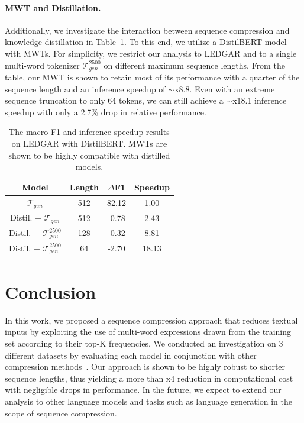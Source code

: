 \documentclass[11pt]{article}
\def\tokgen{\mathcal{T}_{gen}}
\begin{document}
\paragraph{MWT and Distillation.} 
Additionally, we investigate the interaction between sequence compression and knowledge distillation in Table~\ref{table:distillation}. To this end, we utilize a DistilBERT model with MWTs. For simplicity, we restrict our analysis to LEDGAR and to a single multi-word tokenizer $\tokgen^{2500}$ on different maximum sequence lengths. From the table, our MWT is shown to retain most of its performance with a quarter of the sequence length and an inference speedup of $\sim$x8.8. Even with an extreme sequence truncation to only 64 tokens, we can still achieve a $\sim$x18.1 inference speedup with only a 2.7\% drop in relative performance. 

\renewcommand{\arraystretch}{1.3}
\begin{table}[ht]
    \centering
    \begin{tabular}{cccc}
        \hline      
        \textbf{Model}                  & \textbf{Length}   & $\Delta$\textbf{F1}   & \textbf{Speedup}  \\
        \hline
    
        $\tokgen$                       & 512               & 82.12                 &   1.00            \\ 
        
        \hline
        
        Distil. + $\tokgen$             & 512               & -0.78                 &   2.43            \\
        Distil. + $\tokgen^{2500}$      & 128               & -0.32                 &   8.81            \\
        Distil. + $\tokgen^{2500}$      & 64                & -2.70                 &   18.13           \\
    
        \hline            
    \end{tabular} 
    \caption{The macro-F1 and inference speedup results on LEDGAR with DistilBERT. MWTs are shown to be highly compatible with distilled models.}
    \label{table:distillation}
\end{table}



\section{Conclusion}\label{section:conclusion}
In this work, we proposed a sequence compression approach that reduces textual inputs by exploiting the use of multi-word expressions drawn from the training set according to their top-K frequencies. We conducted an investigation on 3 different datasets by evaluating each model in conjunction with other compression methods~\citep{FVT, DistilBERT}. Our approach is shown to be highly robust to shorter sequence lengths, thus yielding a more than x4 reduction in computational cost with negligible drops in performance. In the future, we expect to extend our analysis to other language models and tasks such as language generation in the scope of sequence compression.
\end{document}
